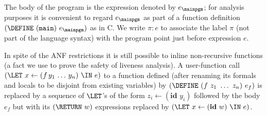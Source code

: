 \documentclass{llncs}
\newcommand{\ID}{\mbox{$\mathbf{ id}$}} %
\begin{document}
The body of the program is
the  expression denoted  by  $e_\mainpgm$; for analysis purposes
it is convenient
to regard $e_\mainpgm$ as part of a function definition
$(\DEFINE\ ({\tt main})\ e_\mainpgm)$ as in C\@.
We write $\pi\!:\!e$ to associate the  label $\pi$ (not part of the language syntax) with the program point just  before expression $e$.

In spite of the ANF restrictions it is still possible
to inline non-recursive functions (a fact we use to prove the safety
of liveness analysis).  A user-function call
$(\LET\,\, x \leftarrow (f\,y_1\,\ldots\,y_n) \,\, \IN\,\, e)$
to a function defined
(after renaming its formals and locals to be disjoint from existing variables)
by $(\DEFINE\ (f\ z_1\ \ldots\ z_n)\ e_f)$
is replaced by a sequence of $\LET$'s of the form
$z_i\leftarrow (\ID\,\,y_i)$ followed by
the body $e_f$ but with its $(\RETURN\,\,w)$ expressions replaced by
$(\LET\,\, x \leftarrow (\ID\,\, w) \,\, \IN\,\, e)$.
\end{document}
